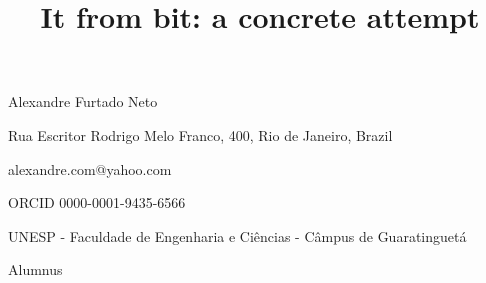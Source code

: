 \documentclass[12pt,english]{article}
\begin{document}
\title{It from bit: a concrete attempt}
\maketitle

Alexandre Furtado Neto

Rua Escritor Rodrigo Melo Franco, 400, Rio de Janeiro, Brazil

alexandre.com@yahoo.com

ORCID 0000-0001-9435-6566 

UNESP - Faculdade de Engenharia e Ciências - Câmpus de Guaratinguetá

Alumnus
\end{document}
